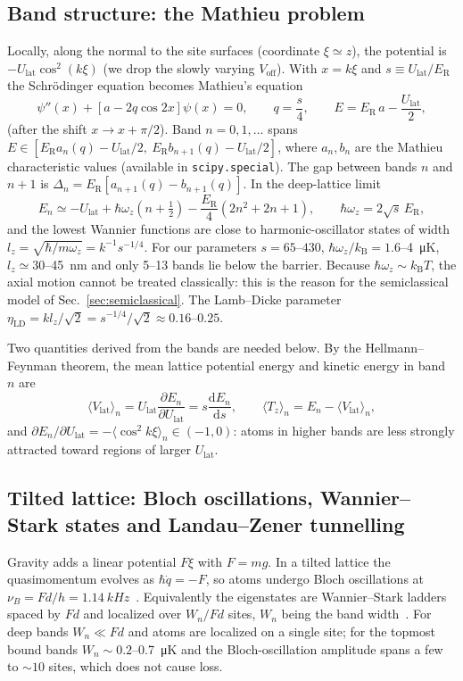 \documentclass[11pt,a4paper]{article}
\newcommand{\dd}{\mathrm{d}}
\newcommand{\kB}{k_\mathrm{B}}
\newcommand{\ER}{E_\mathrm{R}}
\newcommand{\Ulat}{U_\mathrm{lat}}
\newcommand{\Voff}{V_\mathrm{off}}
\begin{document}
\subsection{Band structure: the Mathieu problem}
Locally, along the normal to the site surfaces (coordinate $\xi\simeq z$), the potential is $-\Ulat\cos^2(k\xi)$ (we drop the slowly varying $\Voff$). With $x=k\xi$ and $s\equiv\Ulat/\ER$ the Schrödinger equation becomes Mathieu's equation~\cite{DLMF28,Morsch2006}
\begin{equation}
\psi''(x)+\left[a-2q\cos 2x\right]\psi(x)=0,\qquad q=\frac{s}{4},\qquad E=\ER\, a-\frac{\Ulat}{2},
\end{equation}
(after the shift $x\to x+\pi/2$). Band $n=0,1,\dots$ spans $E\in[\ER a_n(q)-\Ulat/2,\ \ER b_{n+1}(q)-\Ulat/2]$, where $a_n,b_n$ are the Mathieu characteristic values (available in \texttt{scipy.special}). The gap between bands $n$ and $n+1$ is $\Delta_n=\ER[a_{n+1}(q)-b_{n+1}(q)]$. In the deep-lattice limit
\begin{equation}
E_n\simeq-\Ulat+\hbar\omega_z\left(n+\tfrac12\right)-\frac{\ER}{4}\left(2n^2+2n+1\right),\qquad
\hbar\omega_z=2\sqrt{s}\,\ER ,
\label{eq:anharm}
\end{equation}
and the lowest Wannier functions are close to harmonic-oscillator states of width $l_z=\sqrt{\hbar/m\omega_z}=k^{-1}s^{-1/4}$. For our parameters $s=65$--$430$, $\hbar\omega_z/\kB=1.6$--\SI{4}{\micro K}, $l_z\simeq30$--\SI{45}{nm} and only 5--13 bands lie below the barrier. Because $\hbar\omega_z\sim\kB T$, the axial motion cannot be treated classically: this is the reason for the semiclassical model of Sec.~\ref{sec:semiclassical}. The Lamb--Dicke parameter $\eta_\mathrm{LD}=k l_z/\sqrt2=s^{-1/4}/\sqrt2\approx0.16$--$0.25$.

Two quantities derived from the bands are needed below. By the Hellmann--Feynman theorem, the mean lattice potential energy and kinetic energy in band $n$ are
\begin{equation}
\langle V_\mathrm{lat}\rangle_n=\Ulat\frac{\partial E_n}{\partial \Ulat}=s\frac{\dd E_n}{\dd s},\qquad
\langle T_z\rangle_n=E_n-\langle V_\mathrm{lat}\rangle_n ,
\label{eq:HF}
\end{equation}
and $\partial E_n/\partial\Ulat=-\langle\cos^2 k\xi\rangle_n\in(-1,0)$: atoms in higher bands are less strongly attracted toward regions of larger $\Ulat$.

\subsection{Tilted lattice: Bloch oscillations, Wannier--Stark states and Landau--Zener tunnelling}
\label{sec:tilt}
Gravity adds a linear potential $F\xi$ with $F=mg$. In a tilted lattice the quasimomentum evolves as $\hbar\dot q=-F$, so atoms undergo Bloch oscillations at $\nu_B=Fd/h=\SI{1.14}{kHz}$~\cite{BenDahan1996}. Equivalently the eigenstates are Wannier--Stark ladders spaced by $Fd$ and localized over $W_n/Fd$ sites, $W_n$ being the band width~\cite{Gluck2002}. For deep bands $W_n\ll Fd$ and atoms are localized on a single site; for the topmost bound bands $W_n\sim0.2$--\SI{0.7}{\micro K} and the Bloch-oscillation amplitude spans a few to $\sim10$ sites, which does not cause loss.
\end{document}
